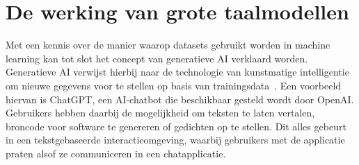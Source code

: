 
\section{De werking van grote taalmodellen}
\label{sec:ls-artificiele-intelligentie}
Met een kennis over de manier waarop datasets gebruikt worden in machine learning kan tot slot het concept van generatieve AI verklaard worden.
Generatieve AI verwijst hierbij naar de technologie van kunstmatige intelligentie om nieuwe gegevens voor te stellen op basis van trainingsdata~\autocite{Gupta2023}.
Een voorbeeld hiervan is ChatGPT, een AI-chatbot die beschikbaar gesteld wordt door OpenAI\@.
Gebruikers hebben daarbij de mogelijkheid om teksten te laten vertalen, broncode voor software te genereren of gedichten op te stellen.
Dit alles gebeurt in een tekstgebaseerde interactieomgeving, waarbij gebruikers met de applicatie praten alsof ze communiceren in een chatapplicatie.

